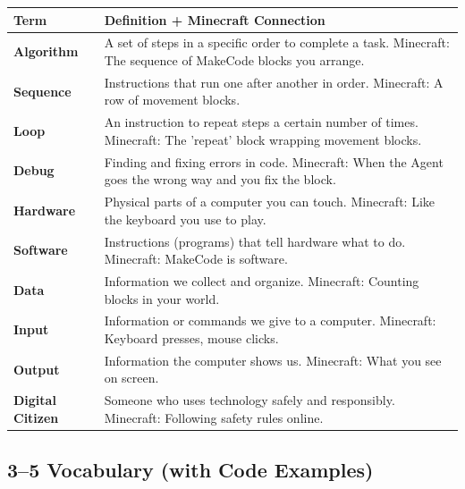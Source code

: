 \documentclass[11pt,letterpaper]{article}
\begin{document}
\begin{longtable}{|L{0.28\textwidth}|L{0.65\textwidth}|}
\hline
{}
\textbf{Term}  & \textbf{Definition + Minecraft Connection}  \\
\hline
\textbf{Algorithm}  & A set of steps in a specific order to complete a task. Minecraft: The sequence of MakeCode blocks you arrange.  \\
\hline
\textbf{Sequence}  & Instructions that run one after another in order. Minecraft: A row of movement blocks.  \\
\hline
\textbf{Loop}  & An instruction to repeat steps a certain number of times. Minecraft: The 'repeat' block wrapping movement blocks.  \\
\hline
\textbf{Debug}  & Finding and fixing errors in code. Minecraft: When the Agent goes the wrong way and you fix the block.  \\
\hline
\textbf{Hardware}  & Physical parts of a computer you can touch. Minecraft: Like the keyboard you use to play.  \\
\hline
\textbf{Software}  & Instructions (programs) that tell hardware what to do. Minecraft: MakeCode is software.  \\
\hline
\textbf{Data}  & Information we collect and organize. Minecraft: Counting blocks in your world.  \\
\hline
\textbf{Input}  & Information or commands we give to a computer. Minecraft: Keyboard presses, mouse clicks.  \\
\hline
\textbf{Output}  & Information the computer shows us. Minecraft: What you see on screen.  \\
\hline
\textbf{Digital Citizen}  & Someone who uses technology safely and responsibly. Minecraft: Following safety rules online.  \\
\hline
\end{longtable}

\subsection{3--5 Vocabulary (with Code Examples)}
\label{sub:35VocabularywithCodeExamples}
\end{document}
